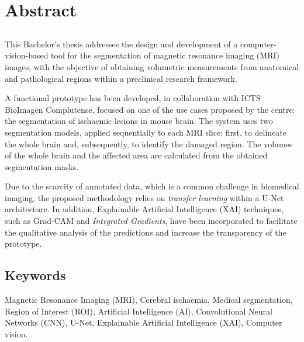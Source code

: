 \chapter*{Abstract}

\section*{\tituloPortadaEngVal}

This Bachelor's thesis addresses the design and development of a computer-vision-based tool for the segmentation of magnetic resonance imaging (MRI) images, with the objective of obtaining volumetric measurements from anatomical and pathological regions within a preclinical research framework.

A functional prototype has been developed, in collaboration with ICTS BioImagen Complutense, focused on one of the use cases proposed by the centre: the segmentation of ischaemic lesions in mouse brain. The system uses two segmentation models, applied sequentially to each MRI slice: first, to delineate the whole brain and, subsequently, to identify the damaged region. The volumes of the whole brain and the affected area are calculated from the obtained segmentation masks.

Due to the scarcity of annotated data, which is a common challenge in biomedical imaging, the proposed methodology relies on \textit{transfer learning} within a U-Net architecture. In addition, Explainable Artificial Intelligence (XAI) techniques, such as Grad-CAM and \textit{Integrated Gradients}, have been incorporated to facilitate the qualitative analysis of the predictions and increase the transparency of the prototype.

\section*{Keywords}

\noindent Magnetic Resonance Imaging (MRI), Cerebral ischaemia, Medical segmentation, Region of Interest (ROI), Artificial Intelligence (AI), Convolutional Neural Networks (CNN), U-Net, Explainable Artificial Intelligence (XAI), Computer vision.
